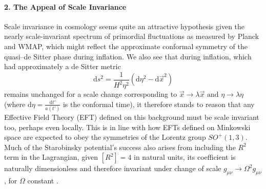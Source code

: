\documentclass[aps,prd,reprint,preprintnumbers,showpacs,floatfix,nofootinbib,superscript address]{revtex4-2}
\newcommand{\wb}[1]{{\color[RGB]{255,0,0}{\textbf{\textit{[WB: #1]}}}}}
\newcommand{\pcs}[1]{{\color[RGB]{0,100,0}{\textbf{\textit{[PCS: #1]}}}}}
\begin{document}
\paragraph*{2. The Appeal of Scale Invariance} Scale invariance in cosmology seems quite an attractive hypothesis given the nearly scale-invariant spectrum of primordial fluctuations as measured by Planck \cite{collaboration_planck_2020, collaboration_bicep_2021} and WMAP, which might reflect the approximate conformal symmetry of the quasi–de Sitter phase during inflation. We also see that during inflation, which had approximately a de Sitter metric
\begin{equation} \label{deSitter Conformal}
    \text{d}s^2 = \frac{1}{H^2\eta^2}(\text{d}\eta^2 - \text{d}\Vec{x}^2)
\end{equation} 
remains unchanged for a scale change corresponding to $\Vec{x} \rightarrow \lambda \Vec{x} \,\, \text{and} \,\, \eta \rightarrow \lambda \eta$ (where $\text{d}\eta =  \frac{\text{d}t'}{a(t')}$ is the conformal time), it therefore stands to reason that any Effective Field Theory (EFT) defined on this background must be scale invariant too, perhaps even locally. This is in line with how EFTs defined on Minkowski space are expected to obey the symmetries of the Lorentz group $SO^+(1,3)$. Much of the Starobinsky potential's success also arises from including the $R^2$ term in the Lagrangian, given $[R^2] = 4$ in natural units, its coefficient is naturally dimensionless and therefore invariant under change of scale $g_{\mu\nu} \rightarrow \Omega^2 g_{\mu\nu}$, for $\Omega$ constant \cite{whitt_fourth-order_1984, Cecchini_2024}.

\end{document}
